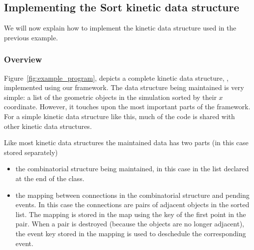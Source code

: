 \subsection{Implementing the Sort kinetic data structure}
\label{sec:sort_kds_overviewl}
We will now explain how to implement the kinetic data structure used in the previous example. 

\subsubsection{Overview}


Figure~\ref{fig:example_program}, depicts a complete kinetic data
structure, , implemented using our
framework. The data structure being maintained is very simple: a list
of the geometric objects in the simulation sorted by their $x$
coordinate. However, it touches upon the most important parts of the
framework. For a simple kinetic data structure like this, much of the
code is shared with other kinetic data structures. 

Like most kinetic data structures the maintained data has
two parts (in this case stored separately)
\begin{itemize}
\item the combinatorial structure being maintained, in this case in the
list  declared at the end of the class.
\item the mapping between connections in the combinatorial structure and 
pending events. In this case the connections are pairs of adjacent
objects in the sorted list. The mapping is stored in the map
 using the key of the first point in the pair.
When a pair is destroyed (because the objects are no longer adjacent),
the event key stored in the mapping is used to deschedule the
corresponding event.
\end{itemize}

